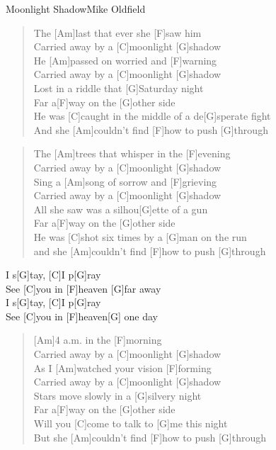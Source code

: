 \begin{song}{Moonlight Shadow}{Mike Oldfield}

    \begin{verse}  
        The [Am]last that ever she [F]saw him \\
        [G]Carried away by a [C]moonlight [G]shadow \\
        He [Am]passed on worried and [F]warning \\
        [G]Carried away by a [C]moonlight [G]shadow \\
        [C]Lost in a riddle that [G]Saturday night \\
        [Am]Far a[F]way on the [G]other side \\
        He was [C]caught in the middle of a de[G]sperate fight \\
        And she [Am]couldn't find [F]how to push [G]through
    \end{verse}  

    \begin{verse}  
        The [Am]trees that whisper in the [F]evening \\
        [G]Carried away by a [C]moonlight [G]shadow \\
        Sing a [Am]song of sorrow and [F]grieving \\
        [G]Carried away by a [C]moonlight [G]shadow \\
        [C]All she saw was a silhou[G]ette of a gun \\
        [Am]Far a[F]way on the [G]other side \\
        He was [C]shot six times by a [G]man on the run \\
        and she [Am]couldn't find [F]how to push [G]through
    \end{verse}  

    \begin{chorus}  
        [C]I s[G]tay, [C]I p[G]ray \\
        See [C]you in [F]heaven [G]far away \\
        [C]I s[G]tay, [C]I p[G]ray \\
        See [C]you in [F]heaven[G] one day
    \end{chorus}  


    \begin{verse}  
        [Am]4 a.m. in the [F]morning \\
        [G]Carried away by a [C]moonlight [G]shadow \\
        As I [Am]watched your vision [F]forming \\
        [G]Carried away by a [C]moonlight [G]shadow \\
        [C]Stars move slowly in a [G]silvery night \\
        [Am]Far a[F]way on the [G]other side \\
        Will you [C]come to talk to [G]me this night \\
        But she [Am]couldn't find [F]how to push [G]through
    \end{verse}  
    

\end{song}
